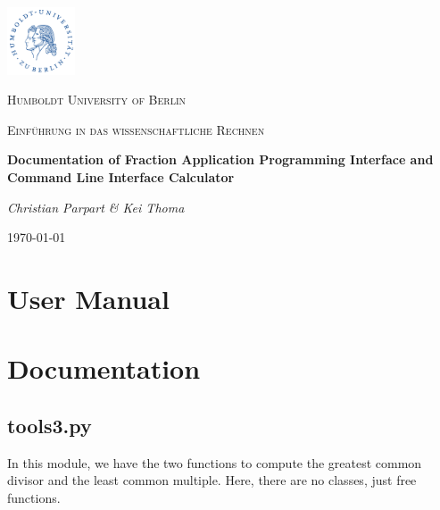 \documentclass[refman]{scrartcl}
\begin{document}

\begin{titlepage}
	\centering
	\includegraphics[width=0.15\textwidth]{graphics/huberlin_logo}\par\vspace{1cm}
	{\scshape\LARGE Humboldt University of Berlin \par}
	\vspace{1cm}
	{\scshape\Large Einf{\"u}hrung in das wissenschaftliche Rechnen \par}
	\vspace{1.5cm}
	{\huge\bfseries Documentation of Fraction Application Programming Interface and Command Line Interface Calculator\par}
	\vspace{2cm}
	{\Large\itshape Christian Parpart \& Kei Thoma \par}
	\vfill

	\vfill

	{\large \today\par}
\end{titlepage}

\tableofcontents
\newpage

\section{User Manual}

\section{Documentation}

\subsection{tools3.py}

In this module, we have the two functions to compute the greatest common divisor and the least common multiple. Here, there are no classes, just free functions.
\end{document}
